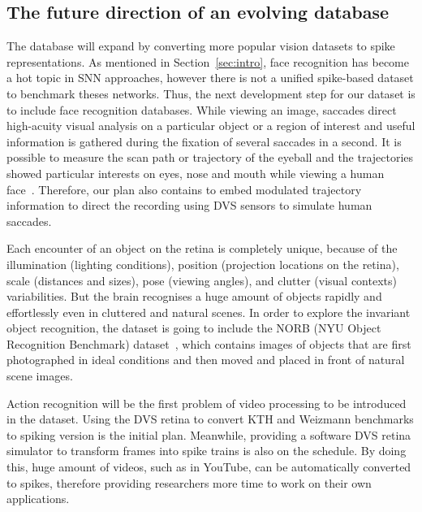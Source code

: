 \subsection{The future direction of an evolving database}
The database will expand by converting more popular vision datasets to spike representations.
As mentioned in Section~\ref{sec:intro}, face recognition has become a hot topic in SNN approaches, however there is not a unified spike-based dataset to benchmark theses networks.
Thus, the next development step for our dataset is to include face recognition databases.
While viewing an image,  saccades direct high-acuity visual analysis on a particular object or a region of interest and useful information is gathered during the fixation of several saccades in a second.
It is possible to measure the scan path or trajectory of the eyeball and the trajectories showed particular interests on eyes, nose and mouth while viewing a human face~\citep{yarbus1967eye}.
Therefore, our plan also contains to embed modulated trajectory information to direct the recording using DVS sensors to simulate human saccades.


Each encounter of an object on the retina is completely unique, because of the illumination (lighting conditions), position (projection locations on the retina), scale (distances and sizes), pose (viewing angles), and clutter (visual contexts) variabilities.
But the brain recognises a huge amount of objects rapidly and effortlessly even in cluttered and natural scenes.
In order to explore the invariant object recognition, the dataset is going to include the NORB (NYU Object Recognition Benchmark) dataset~\citep{lecun2004learning}, which contains images of objects that are first photographed in ideal conditions and then moved and placed in front of natural scene images.

Action recognition will be the first problem of video processing to be introduced in the dataset.
Using the DVS retina to convert KTH and Weizmann benchmarks to spiking version is the initial plan.
Meanwhile, providing a software DVS retina simulator to transform  frames into spike trains is also on the schedule.
By doing this, huge amount of videos, such as in YouTube, can be automatically converted to spikes, therefore providing researchers more time to work on their own applications.


